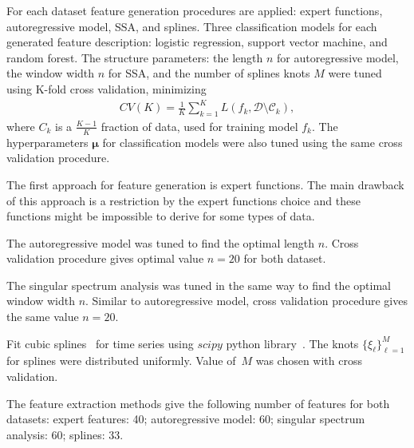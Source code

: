 \documentclass[a4paper,12pt]{article}
\begin{document}
For each dataset feature generation procedures are applied: expert functions, autoregressive model, SSA, and splines. 
Three classification models for each generated feature description: logistic regression, support vector machine, and random forest. 
The structure parameters: the length $n$ for autoregressive model, the window width $n$ for SSA, and the number of splines knots $M$ were tuned using K-fold cross validation, minimizing
\begin{align}\label{cv}
CV(K) = \frac{1}{K}\sum_{k=1}^{K} L(f_k, \mathcal{D}\setminus \mathcal{C}_k),
\end{align}
where $C_k$ is a $\frac{K-1}{K}$ fraction of data, used for training model $f_k$.
The hyperparameters $\boldsymbol{\mu}$ for classification models were also tuned using the same cross validation procedure. 

The first approach for feature generation is expert functions. The main drawback of this approach is a restriction by the expert functions choice and these functions might be impossible to derive for some types of data.

The autoregressive model was tuned to find the optimal length $n$. Cross validation procedure gives optimal value $n=20$ for both dataset. 

The singular spectrum analysis was tuned in the same way to find the optimal window width $n$. Similar to autoregressive model, cross validation procedure gives the same value $n=20$.


Fit cubic splines~\cite{deboor1978splines} for time series using $scipy$ python library~\cite{scipy}. 
The knots $\{\xi_{\ell}\}_{\ell = 1}^M$ for splines were distributed uniformly. 
Value of~$M$ was chosen with cross validation. 

The feature extraction methods give the following number of features for both datasets: expert features: 40; autoregressive model: 60; singular spectrum analysis: 60; splines: 33.
\end{document}
